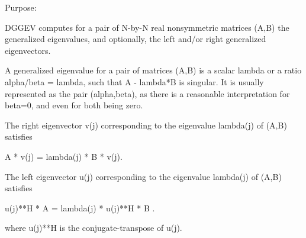  \begin{DoxyParagraph}{Purpose\+: }
\begin{DoxyVerb} DGGEV computes for a pair of N-by-N real nonsymmetric matrices (A,B)
 the generalized eigenvalues, and optionally, the left and/or right
 generalized eigenvectors.

 A generalized eigenvalue for a pair of matrices (A,B) is a scalar
 lambda or a ratio alpha/beta = lambda, such that A - lambda*B is
 singular. It is usually represented as the pair (alpha,beta), as
 there is a reasonable interpretation for beta=0, and even for both
 being zero.

 The right eigenvector v(j) corresponding to the eigenvalue lambda(j)
 of (A,B) satisfies

                  A * v(j) = lambda(j) * B * v(j).

 The left eigenvector u(j) corresponding to the eigenvalue lambda(j)
 of (A,B) satisfies

                  u(j)**H * A  = lambda(j) * u(j)**H * B .

 where u(j)**H is the conjugate-transpose of u(j).\end{DoxyVerb}
 
\end{DoxyParagraph}

